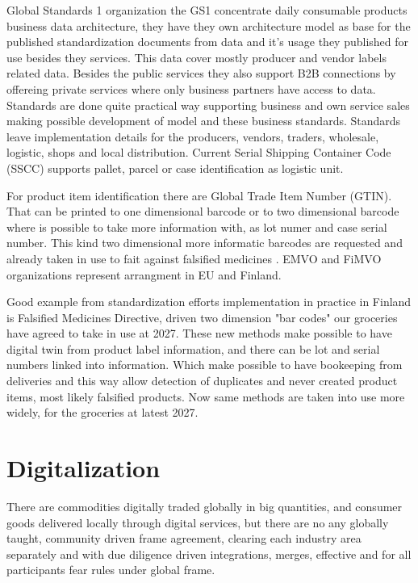 Global Standards 1 organization the GS1\cite{GS1Standards} concentrate daily
consumable products business data architecture, they have they own architecture
model as base for the published standardization documents from data and it's
usage they published for use besides they services. This data cover mostly
producer and vendor labels related data. Besides the public services they also
support B2B connections by offereing private services where only business
partners have access to data. Standards are done quite practical way supporting
business and own service sales making possible development of model and these
business standards. Standards leave implementation details for the producers,
vendors, traders, wholesale, logistic, shops and local distribution. Current
Serial Shipping Container Code (SSCC)\cite{SSCC} supports pallet, parcel or
case identification as logistic unit.

For product item identification there are Global Trade Item Number
(GTIN)\cite{GTIN}. That can be printed to one dimensional barcode or to two
dimensional barcode where is possible to take more information with, as
lot numer and case serial number. This kind two dimensional more informatic
barcodes are requested and already taken in use to fait against falsified
medicines \cite{FalsifiedMedicines}. EMVO\cite{EMVO} and FiMVO\cite{FiMVO}
organizations represent arrangment in EU and Finland.

Good example from standardization efforts implementation in practice in Finland
is Falsified Medicines
Directive\cite{Falsified_Medicines_Directive}\cite{FalsifiedMedicines}\cite{EMVO}\cite{FiMVO},
driven two dimension "bar codes" our groceries have agreed to take in use at
2027\cite{GS1DL2027}\cite{Finland2DcodesY27}. These new methods make possible
to have digital twin from product label information, and there can be lot and
serial numbers linked into information. Which make possible to have bookeeping
from deliveries and this way allow detection of duplicates and never created
product items, most likely falsified products. Now same methods are taken into
use more widely, for the groceries at latest 2027.

\section{Digitalization}
\label{digitalization}
There are commodities digitally traded globally in big quantities, and consumer
goods delivered locally through digital services, but there are no any globally
taught, community driven frame agreement, clearing each industry area separately
and with due diligence driven integrations, merges, effective and for all
participants fear rules under global frame.

